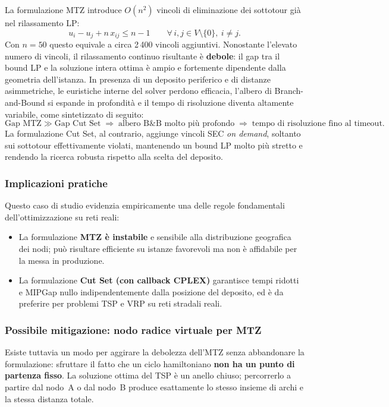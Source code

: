 \documentclass[a4paper,12pt]{article}
\begin{document}
La formulazione MTZ introduce $O(n^2)$ vincoli di eliminazione dei sottotour già nel rilassamento LP:
\[
u_i - u_j + n\,x_{ij} \le n-1 \qquad \forall\,i,j \in V\setminus\{0\},\ i\neq j.
\]
Con $n=50$ questo equivale a circa 2\,400 vincoli aggiuntivi. Nonostante l'elevato numero di vincoli, il rilassamento continuo risultante è \textbf{debole}: il gap tra il bound LP e la soluzione intera ottima è ampio e fortemente dipendente dalla geometria dell'istanza. In presenza di un deposito periferico e di distanze asimmetriche, le euristiche interne del solver perdono efficacia, l'albero di Branch-and-Bound si espande in profondità e il tempo di risoluzione diventa altamente variabile, come sintetizzato di seguito:
\[
\text{Gap MTZ} \gg \text{Gap Cut Set}
\;\Rightarrow\;
\text{albero B\&B molto più profondo}
\;\Rightarrow\;
\text{tempo di risoluzione fino al timeout}.
\]
La formulazione Cut Set, al contrario, aggiunge vincoli SEC \textit{on demand}, soltanto sui sottotour effettivamente violati, mantenendo un bound LP molto più stretto e rendendo la ricerca robusta rispetto alla scelta del deposito.

\subsubsection*{Implicazioni pratiche}

Questo caso di studio evidenzia empiricamente una delle regole fondamentali dell'ottimizzazione su reti reali:
\begin{itemize}
  \item La formulazione \textbf{MTZ è instabile} e sensibile alla distribuzione geografica dei nodi; può risultare efficiente su istanze favorevoli ma non è affidabile per la messa in produzione.
  \item La formulazione \textbf{Cut Set (con callback CPLEX)} garantisce tempi ridotti e MIPGap nullo indipendentemente dalla posizione del deposito, ed è da preferire per problemi TSP e VRP su reti stradali reali.
\end{itemize}

\subsubsection*{Possibile mitigazione: nodo radice virtuale per MTZ}

Esiste tuttavia un modo per aggirare la debolezza dell'MTZ senza abbandonare la formulazione: sfruttare il fatto che un ciclo hamiltoniano \textbf{non ha un punto di partenza fisso}. La soluzione ottima del TSP è un anello chiuso; percorrerlo a partire dal nodo~A o dal nodo~B produce esattamente lo stesso insieme di archi e la stessa distanza totale.
\end{document}
